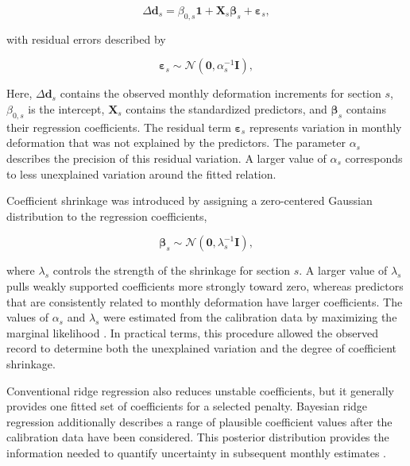 \begin{equation}
\Delta\boldsymbol{d}_s
=
\beta_{0,s}\boldsymbol{1}
+
\boldsymbol{X}_s\boldsymbol{\beta}_s
+
\boldsymbol{\varepsilon}_s,
\label{eq:brr_regression}
\end{equation}

\noindent with residual errors described by

\begin{equation}
\boldsymbol{\varepsilon}_s
\sim
\mathcal{N}
\left(
\boldsymbol{0},
\alpha_s^{-1}\boldsymbol{I}
\right),
\label{eq:brr_likelihood}
\end{equation}

\noindent Here, $\Delta\boldsymbol{d}_s$ contains the observed monthly deformation increments for section $s$, $\beta_{0,s}$ is the intercept, $\boldsymbol{X}_s$ contains the standardized predictors, and $\boldsymbol{\beta}_s$ contains their regression coefficients. The residual term $\boldsymbol{\varepsilon}_s$ represents variation in monthly deformation that was not explained by the predictors. The parameter $\alpha_s$ describes the precision of this residual variation. A larger value of $\alpha_s$ corresponds to less unexplained variation around the fitted relation.

Coefficient shrinkage was introduced by assigning a zero-centered Gaussian distribution to the regression coefficients,

\begin{equation}
\boldsymbol{\beta}_s
\sim
\mathcal{N}
\left(
\boldsymbol{0},
\lambda_s^{-1}\boldsymbol{I}
\right),
\label{eq:brr_prior}
\end{equation}

\noindent where $\lambda_s$ controls the strength of the shrinkage for section $s$. A larger value of $\lambda_s$ pulls weakly supported coefficients more strongly toward zero, whereas predictors that are consistently related to monthly deformation have larger coefficients. The values of $\alpha_s$ and $\lambda_s$ were estimated from the calibration data by maximizing the marginal likelihood \citep{mackay_bayesian_1992, bishop_pattern_2006}. In practical terms, this procedure allowed the observed record to determine both the unexplained variation and the degree of coefficient shrinkage.

Conventional ridge regression also reduces unstable coefficients, but it generally provides one fitted set of coefficients for a selected penalty. Bayesian ridge regression additionally describes a range of plausible coefficient values after the calibration data have been considered. This posterior distribution provides the information needed to quantify uncertainty in subsequent monthly estimates \citep{bishop_pattern_2006, gelman_bayesian_2013, tarantola_inverse_2005}.

